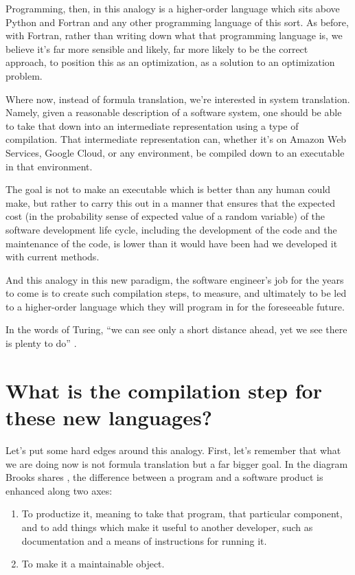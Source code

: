 \documentclass[12pt]{extarticle}
\begin{document}
Programming, then, in this analogy is a higher-order language which sits above Python and Fortran and any other programming language of this sort. As before, with Fortran, rather than writing down what that programming language is, we believe it's far more sensible and likely, far more likely to be the correct approach, to position this as an optimization, as a solution to an optimization problem.

Where now, instead of formula translation, we're interested in system translation. Namely, given a reasonable description of a software system, one should be able to take that down into an intermediate representation using a type of compilation. That intermediate representation can, whether it's on Amazon Web Services, Google Cloud, or any environment, be compiled down to an executable in that environment.

The goal is not to make an executable which is better than any human could make, but rather to carry this out in a manner that ensures that the expected cost (in the probability sense of expected value of a random variable) of the software development life cycle, including the development of the code and the maintenance of the code, is lower than it would have been had we developed it with current methods.

And this analogy in this new paradigm, the software engineer's job for the years to come is to create such compilation steps, to measure, and ultimately to be led to a higher-order language which they will program in for the foreseeable future.

In the words of Turing, ``we can see only a short distance ahead, yet we see there is plenty to do'' \cite{turing1950}.

\section{What is the compilation step for these new languages?}

Let's put some hard edges around this analogy. First, let's remember that what we are doing now is not formula translation but a far bigger goal. In the diagram Brooks shares \cite{brooks1995}, the difference between a program and a software product is enhanced along two axes:
\begin{enumerate}
  \item To productize it, meaning to take that program, that particular component, and to add things which make it useful to another developer, such as documentation and a means of instructions for running it.
  \item To make it a maintainable object.
\end{enumerate}
\end{document}

